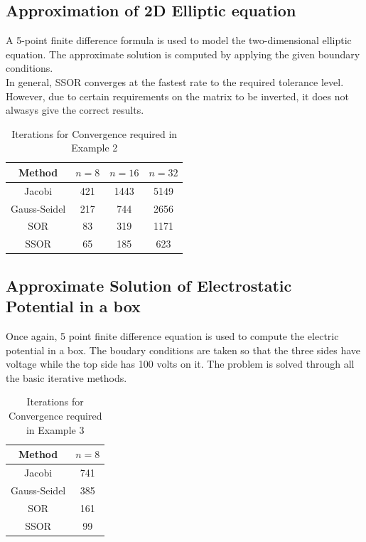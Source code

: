 \documentclass[11pt]{article}
\begin{document}
\subsection{Approximation of 2D Elliptic equation}

A 5-point finite difference formula is used to model the two-dimensional elliptic equation. The approximate solution is computed by applying the given boundary conditions.\\
In general, SSOR converges at the fastest rate to the required tolerance level. However, due to certain requirements on the matrix to be inverted, it does not alwasys give the correct results.

\begin{table}[!hbt]
\begin{center}
{\def\arraystretch{.95}
\begin{tabular}{|c|c|c|c|}

\hline
Method & $n = 8$  &  $n = 16$  &  $n = 32$\\
\hline
Jacobi & 421 & 1443& 5149\\ 
\hline
Gauss-Seidel & 217 & 744 & 2656\\
\hline
SOR & 83 & 319 & 1171\\
\hline
SSOR &65 & 185 & 623\\
\hline
\end{tabular}}
\end{center}
\caption{Iterations for Convergence required in Example 2}
\end{table}

\bigskip

\subsection{Approximate Solution of Electrostatic Potential in a box}

Once again,  5 point finite difference equation is used to compute the electric potential in a box. The boudary conditions are taken so that the three sides have voltage while the top side has 100 volts on it. The problem is solved through all the basic iterative methods.

\begin{table}[!hbt]
\begin{center}
{\def\arraystretch{.95}
\begin{tabular}{|c|c|}

\hline
Method & $n = 8$  \\
\hline
Jacobi & 741 \\ 
\hline
Gauss-Seidel & 385 \\
\hline
SOR & 161 \\
\hline
SSOR &99 \\
\hline
\end{tabular}}
\end{center}
\caption{Iterations for Convergence required in Example 3}
\end{table}
\end{document}

